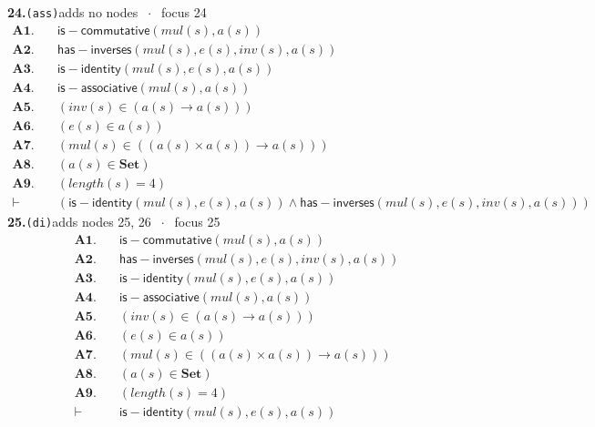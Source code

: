 \documentclass[11pt]{article}
\begin{document}
\medskip\noindent\textbf{24.}\quad \texttt{(ass)}\hfill{\small adds no nodes $\;\cdot\;$ focus 24}\\[2pt]
\begin{align*}
  \mathbf{A1.}\quad & \mathsf{is{-}commutative}(\mathit{mul}(s), a(s)) \\
  \mathbf{A2.}\quad & \mathsf{has{-}inverses}(\mathit{mul}(s), e(s), \mathit{inv}(s), a(s)) \\
  \mathbf{A3.}\quad & \mathsf{is{-}identity}(\mathit{mul}(s), e(s), a(s)) \\
  \mathbf{A4.}\quad & \mathsf{is{-}associative}(\mathit{mul}(s), a(s)) \\
  \mathbf{A5.}\quad & (\mathit{inv}(s) \in (a(s) \to a(s))) \\
  \mathbf{A6.}\quad & (e(s) \in a(s)) \\
  \mathbf{A7.}\quad & (\mathit{mul}(s) \in ((a(s) \times a(s)) \to a(s))) \\
  \mathbf{A8.}\quad & (a(s) \in \mathbf{Set}) \\
  \mathbf{A9.}\quad & (\mathit{length}(s) = 4) \\
  \vdash\quad & (\mathsf{is{-}identity}(\mathit{mul}(s), e(s), a(s)) \wedge \mathsf{has{-}inverses}(\mathit{mul}(s), e(s), \mathit{inv}(s), a(s)))
\end{align*}
\medskip\noindent\textbf{25.}\quad \texttt{(di)}\hfill{\small adds nodes 25, 26 $\;\cdot\;$ focus 25}\\[2pt]
\begin{align*}
  \mathbf{A1.}\quad & \mathsf{is{-}commutative}(\mathit{mul}(s), a(s)) \\
  \mathbf{A2.}\quad & \mathsf{has{-}inverses}(\mathit{mul}(s), e(s), \mathit{inv}(s), a(s)) \\
  \mathbf{A3.}\quad & \mathsf{is{-}identity}(\mathit{mul}(s), e(s), a(s)) \\
  \mathbf{A4.}\quad & \mathsf{is{-}associative}(\mathit{mul}(s), a(s)) \\
  \mathbf{A5.}\quad & (\mathit{inv}(s) \in (a(s) \to a(s))) \\
  \mathbf{A6.}\quad & (e(s) \in a(s)) \\
  \mathbf{A7.}\quad & (\mathit{mul}(s) \in ((a(s) \times a(s)) \to a(s))) \\
  \mathbf{A8.}\quad & (a(s) \in \mathbf{Set}) \\
  \mathbf{A9.}\quad & (\mathit{length}(s) = 4) \\
  \vdash\quad & \mathsf{is{-}identity}(\mathit{mul}(s), e(s), a(s))
\end{align*}
\end{document}
